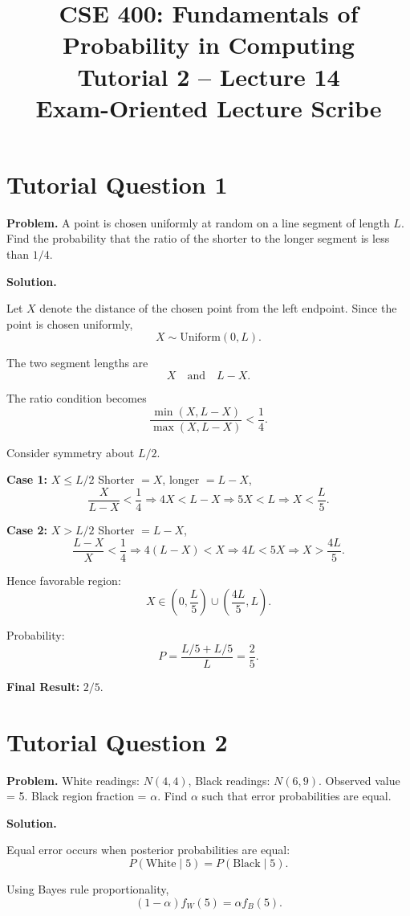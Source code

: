 \documentclass[12pt]{article}
\title{CSE 400: Fundamentals of Probability in Computing\\
Tutorial 2 -- Lecture 14 \\ Exam-Oriented Lecture Scribe}
\date{}
\begin{document}
\maketitle

\section*{Tutorial Question 1}

\textbf{Problem.}
A point is chosen uniformly at random on a line segment of length $L$.  
Find the probability that the ratio of the shorter to the longer segment is less than $1/4$.

\textbf{Solution.}

Let $X$ denote the distance of the chosen point from the left endpoint.  
Since the point is chosen uniformly,
\[
X \sim \text{Uniform}(0,L).
\]

The two segment lengths are
\[
X \quad \text{and} \quad L-X.
\]

The ratio condition becomes
\[
\frac{\min(X,L-X)}{\max(X,L-X)} < \frac14.
\]

Consider symmetry about $L/2$.

\textbf{Case 1:} $X \le L/2$  
Shorter $=X$, longer $=L-X$,
\[
\frac{X}{L-X}<\frac14
\Rightarrow 4X<L-X
\Rightarrow 5X<L
\Rightarrow X<\frac{L}{5}.
\]

\textbf{Case 2:} $X>L/2$  
Shorter $=L-X$,
\[
\frac{L-X}{X}<\frac14
\Rightarrow 4(L-X)<X
\Rightarrow 4L<5X
\Rightarrow X>\frac{4L}{5}.
\]

Hence favorable region:
\[
X\in\left(0,\frac{L}{5}\right)\cup\left(\frac{4L}{5},L\right).
\]

Probability:
\[
P=\frac{L/5+L/5}{L}=\frac{2}{5}.
\]

\textbf{Final Result:} $\boxed{2/5}$.

\section*{Tutorial Question 2}

\textbf{Problem.}
White readings: $N(4,4)$, Black readings: $N(6,9)$.  
Observed value = 5. Black region fraction = $\alpha$.  
Find $\alpha$ such that error probabilities are equal.

\textbf{Solution.}

Equal error occurs when posterior probabilities are equal:
\[
P(\text{White}\mid 5)=P(\text{Black}\mid 5).
\]

Using Bayes rule proportionality,
\[
(1-\alpha)f_W(5)=\alpha f_B(5).
\]
\end{document}
